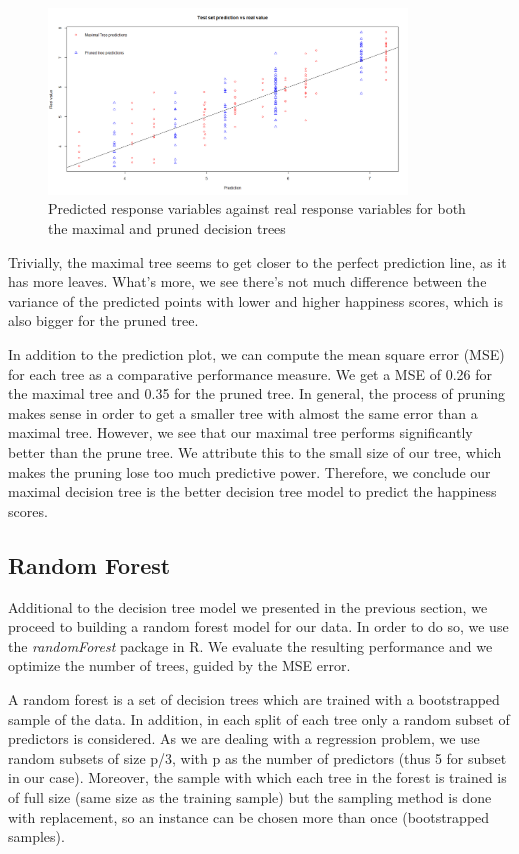 \documentclass[12pt]{extarticle}
\begin{document}
\begin{figure}[H]
  \centering
    \includegraphics[width=0.85\textwidth]{figures/tree-predict.png}
    \caption{Predicted response variables against real response variables for both the maximal and pruned decision trees\label{fig:tree_predict}}
\end{figure}

Trivially, the maximal tree seems to get closer to the perfect prediction line, as it has more leaves.  What’s more, we see there’s not much difference between the variance of the predicted points with lower and higher happiness scores, which is also bigger for the pruned tree.

In addition to the prediction plot, we can compute the mean square error (MSE) for each tree as a comparative performance measure. We get a MSE of 0.26 for the maximal tree and 0.35 for the pruned tree. In general, the process of pruning makes sense in order to get a smaller tree with almost the same error than a maximal tree. However, we see that our maximal tree performs significantly better than the prune tree. We attribute this to the small size of our tree, which makes the pruning lose too much predictive power. Therefore, we conclude our maximal decision tree is the better decision tree model to predict the happiness scores.


\subsection{Random Forest}

Additional to the decision tree model we presented in the previous section, we proceed to building a random forest model for our data. In order to do so, we use the \textit{randomForest} package in R. We evaluate the resulting performance and we optimize the number of trees, guided by the MSE error.

A random forest is a set of decision trees which are trained with a bootstrapped sample of the data. In addition, in each split of each tree only a random subset of predictors is considered. As we are dealing with a regression problem, we use random subsets of size p/3, with p as the number of predictors (thus 5 for subset in our case). Moreover, the sample with which each tree in the forest is trained is of full size (same size as the training sample) but the sampling method is done with replacement, so an instance can be chosen more than once (bootstrapped samples).
\end{document}
